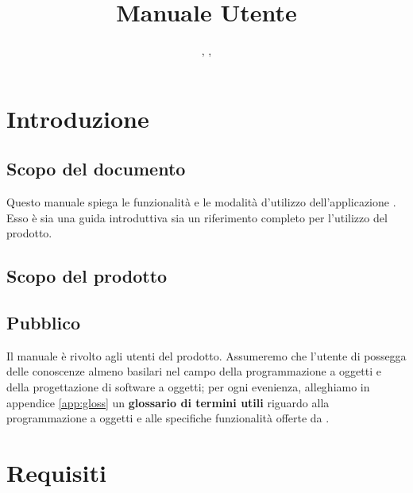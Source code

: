 


\author{\LB, \GG, \AZ}
\supervisor{\PB}
\title{Manuale Utente}


\maketitle

\tableofcontents






\section{Introduzione}

\subsection{Scopo del documento}
Questo manuale spiega le funzionalità e le modalità d'utilizzo dell'applicazione \proj. Esso è sia una guida introduttiva sia un riferimento completo per l'utilizzo del prodotto.

\subsection{Scopo del prodotto}
\scopo

\subsection{Pubblico}
Il manuale è rivolto agli utenti del prodotto. Assumeremo che l'utente di \proj{} possegga delle conoscenze almeno basilari nel campo della programmazione a oggetti e della progettazione di software a oggetti; per ogni evenienza, alleghiamo in appendice \ref{app:gloss} un \textbf{glossario di termini utili} riguardo alla programmazione a oggetti e alle specifiche funzionalità offerte da \proj.






\section{Requisiti} \label{sec:requisiti}

